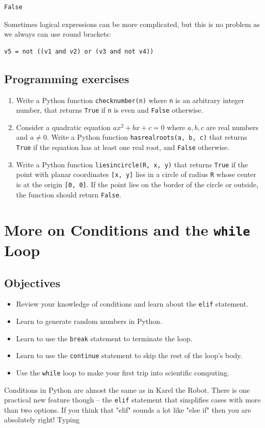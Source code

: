 \begin{verbatim}
False
\end{verbatim}
Sometimes logical expressions can be more complicated, but this is no problem
as we always can use round brackets: 

\begin{verbatim}
v5 = not ((v1 and v2) or (v3 and not v4))
\end{verbatim}



\subsection{Programming exercises}

\begin{enumerate}
\item Write a Python function {\tt checknumber(n)} where {\tt n} is an arbitrary 
      integer number, that returns {\tt True} if {\tt n} is even and {\tt False}
      otherwise.
\item Consider a quadratic equation $ax^2 + bx + c = 0$ where $a, b, c$ are real numbers 
      and $a \not = 0$. Write a Python function 
      {\tt hasrealroots(a, b, c)} that returns {\tt True} if the equation has 
      at least one real root, and {\tt False} otherwise.
\item Write a Python function {\tt liesincircle(R, x, y)} that returns {\tt True} if 
      the point with planar coordinates {\tt [x, y]} lies in a circle of radius {\tt R}
      whose center is at the origin {\tt [0, 0]}. If the point lies on the border of the 
      circle or outside, the function should return {\tt False}.
\end{enumerate}

\section{More on Conditions and the {\tt while} Loop} \label{sec:while}

\subsection{Objectives}

\begin{itemize}
\item Review your knowledge of conditions and learn about the {\tt elif} statement.
\item Learn to generate random numbers in Python.
\item Learn to use the {\tt break} statement to terminate the loop.
\item Learn to use the {\tt continue} statement to skip the rest of the loop's body.
\item Use the {\tt while} loop to make your first trip into scientific computing.
\end{itemize}
Conditions in Python are almost the same as in Karel the Robot. There is one practical 
new feature though -- the {\tt elif} statement that simplifies 
cases with more than two options. If you think that "elif" sounds a lot like "else if" then 
you are absolutely right! Typing 

